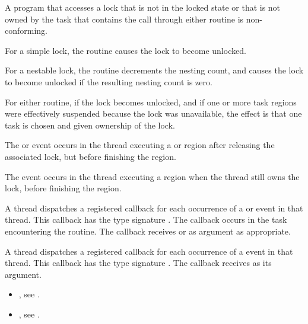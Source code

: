 \constraints
A program that accesses a lock that is not in the locked state or that is
not owned by the task that contains the call through either routine is
non-conforming.


\effect
For a simple lock, the  routine causes the lock to become unlocked.

For a nestable lock, the  routine decrements the nesting
count, and causes the lock to become unlocked if the resulting nesting count is zero.

For either routine, if the lock becomes unlocked, and if one or more task
regions were effectively suspended because the lock was unavailable, the
effect is that one task is chosen and given ownership of the lock.

\events

The  or  event occurs in the thread
executing a  or  region
after releasing the associated lock, but before finishing the region.

The  event occurs in the thread
executing a  region
when the thread still owns the lock,
before finishing the region.


\tools

A thread dispatches a registered 
callback for each occurrence of a  or  event
in that thread.  This callback has the type signature .
The callback occurs in the task encountering
the routine. The callback receives  or
  as  argument as appropriate.

A thread dispatches a registered 
callback for each occurrence of a  event
in that thread. This callback has the type signature .
The callback receives  as its  argument.

\crossreferences
\begin{itemize}
\item {}, see
.
\item {}, see
.
\end{itemize}









